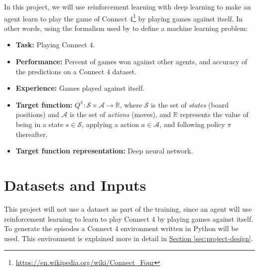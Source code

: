 \documentclass{article}
\begin{document}
\newcommand{\URLcf}{https://en.wikipedia.org/wiki/Connect_Four}

In this project, we will use reinforcement learning with deep learning to make an agent learn to
play the game of {Connect 4}\footnote{\url{\URLcf}} by playing games against itself. In other words,
using the formalism used by \cite{Mitchell1997Book} to define a machine learning problem:

\begin{itemize}

    \item \textbf{Task:} Playing Connect 4.

    \item \textbf{Performance:} Percent of games won against other agents, and accuracy of the
        predictions on a Connect 4 dataset.

    \item \textbf{Experience:} Games played against itself.

    \item \textbf{Target function:} $Q^\pi : \mathcal{S} \times \mathcal{A} \to \mathbb{R}$, where
        $\mathcal{S}$ is the set of \emph{states} (board positions) and $\mathcal{A}$ is the set of
        \emph{actions} (moves), and $\mathbb{R}$ represents the value of being in a state $s \in
        \mathcal{S}$, applying a action $a \in \mathcal{A}$, and following policy $\pi$ thereafter.

    \item \textbf{Target function representation:} Deep neural network.

\end{itemize}

\section{Datasets and Inputs}

This project will not use a dataset as part of the training, since an agent will use reinforcement
learning to learn to play Connect 4 by playing games against itself. To generate the episodes a
Connect 4 environment written in Python will be used. This environment is explained more in detail
in \hyperref[sec:project-design]{Section \ref*{sec:project-design}}.
\end{document}
